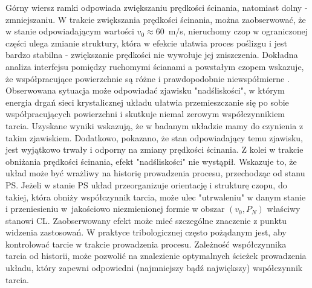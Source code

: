 \documentclass[12pt,a4paper,openright]{report} %
\begin{document}
Górny wiersz ramki odpowiada zwiększaniu prędkości ścinania, natomiast dolny - zmniejszaniu. W trakcie zwiększania prędkości ścinania, można zaobserwować, że w stanie odpowiadającym wartości $v_0 \approx 60$~m/s, nieruchomy czop w ograniczonej części ulega zmianie struktury, która w efekcie ułatwia proces poślizgu i jest bardzo stabilna - zwiększanie prędkości nie wywołuje jej zniszczenia. Dokładna analiza interfejsu pomiędzy ruchomymi ścianami a powstałym czopem wskazuje, że współpracujące powierzchnie są różne i prawdopodobnie niewspółmierne \cite{SpringerHandbook}. Obserwowana sytuacja może odpowiadać zjawisku "nadśliskości", w którym energia drgań sieci krystalicznej układu ułatwia przemieszczanie się po sobie współpracujących powierzchni i skutkuje niemal zerowym współczynnikiem tarcia. Uzyskane wyniki wskazują, że w badanym układzie mamy do czynienia z takim zjawiskiem. Dodatkowo, pokazano, że stan odpowiadający temu zjawisku, jest wyjątkowo trwały i odporny na zmiany prędkości ścinania. Z kolei w trakcie obniżania prędkości ścinania, efekt "nadśliskości" nie wystąpił. Wskazuje to, że układ może być wrażliwy na historię prowadzenia procesu, przechodząc od stanu PS. Jeżeli w stanie PS układ przeorganizuje orientację i strukturę czopu, do takiej, która obniży współczynnik tarcia, może ulec "utrwaleniu" w danym stanie i przeniesieniu w~jakościowo niezmienionej formie w obszar $(v_0, P_N)$ właściwy stanowi CL. Zaobserwowany efekt może mieć szczególne znaczenie z punktu widzenia zastosowań. W praktyce tribologicznej często pożądanym jest, aby kontrolować tarcie w trakcie prowadzenia procesu. Zależność współczynnika tarcia od historii, może pozwolić na znalezienie optymalnych ścieżek prowadzenia układu, który zapewni odpowiedni (najmniejszy bądź największy) współczynnik tarcia. 
%
%
%
%
%
%
%
\end{document}
